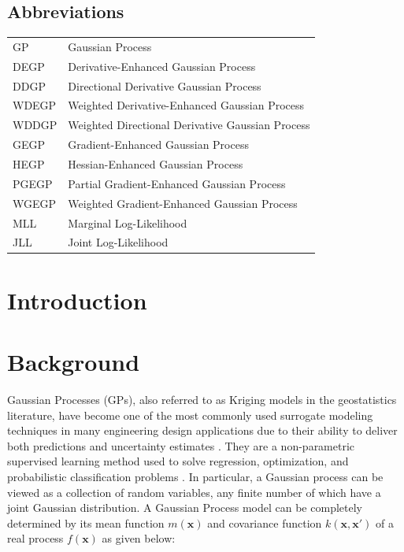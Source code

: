 \documentclass[12pt]{article}
\begin{document}
	\subsection*{Abbreviations}
	\begin{tabular}{@{}l l@{}}
		GP & Gaussian Process \\
		DEGP & Derivative-Enhanced Gaussian Process \\
		DDGP & Directional Derivative Gaussian Process \\
		WDEGP & Weighted Derivative-Enhanced Gaussian Process \\
		WDDGP & Weighted Directional Derivative Gaussian Process \\
		GEGP & Gradient-Enhanced Gaussian Process \\
		HEGP & Hessian-Enhanced Gaussian Process \\
		PGEGP & Partial Gradient-Enhanced Gaussian Process \\
		WGEGP & Weighted Gradient-Enhanced Gaussian Process \\
		MLL & Marginal Log-Likelihood \\
		JLL & Joint Log-Likelihood \\
	\end{tabular}
	
	\section{Introduction}
	\label{sec:introduction}
	

	
	\section{Background}
	\label{sec:background}
	

Gaussian Processes (GPs), also referred to as Kriging models in the geostatistics literature, have become one of the most commonly used surrogate modeling techniques in many engineering design applications due to their ability to deliver both predictions and uncertainty estimates \cite{10.1115/DETC2019-97499,georges1963principles, Krig,GP}. They are a non-parametric supervised learning method used to solve regression, optimization, and probabilistic classification problems \cite{rasmussen2006gaussian}. In particular, a Gaussian process can be viewed as a collection of random variables, any finite number of which have a joint Gaussian distribution. A Gaussian Process model can be completely determined by its mean function $m(\mathbf{x})$ and covariance function $k(\mathbf{x}, \mathbf{x}')$ of a real process $f(\mathbf{x})$ as given below:
\end{document}
